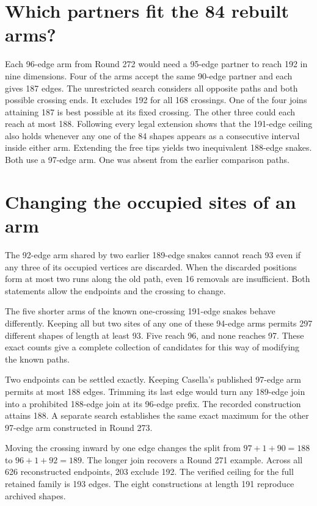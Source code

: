 \documentclass[11pt,a4paper]{article}
\begin{document}
\section{Which partners fit the 84 rebuilt arms?}
Each 96-edge arm from Round 272 would need a 95-edge partner to reach 192 in nine dimensions. Four of the arms accept the same 90-edge partner and each gives 187 edges. The unrestricted search considers all opposite paths and both possible crossing ends. It excludes 192 for all 168 crossings. One of the four joins attaining 187 is best possible at its fixed crossing. The other three could each reach at most 188. Following every legal extension shows that the 191-edge ceiling also holds whenever any one of the 84 shapes appears as a consecutive interval inside either arm. Extending the free tips yields two inequivalent 188-edge snakes. Both use a 97-edge arm. One was absent from the earlier comparison paths.

\section{Changing the occupied sites of an arm}
The 92-edge arm shared by two earlier 189-edge snakes cannot reach 93 even if any three of its occupied vertices are discarded. When the discarded positions form at most two runs along the old path, even 16 removals are insufficient. Both statements allow the endpoints and the crossing to change.

The five shorter arms of the known one-crossing 191-edge snakes behave differently. Keeping all but two sites of any one of these 94-edge arms permits 297 different shapes of length at least 93. Five reach 96, and none reaches 97. These exact counts give a complete collection of candidates for this way of modifying the known paths.

Two endpoints can be settled exactly. Keeping Casella's published 97-edge arm permits at most 188 edges. Trimming its last edge would turn any 189-edge join into a prohibited 188-edge join at its 96-edge prefix. The recorded construction attains 188. A separate search establishes the same exact maximum for the other 97-edge arm constructed in Round 273.

Moving the crossing inward by one edge changes the split from \(97+1+90=188\) to \(96+1+92=189\). The longer join recovers a Round 271 example. Across all 626 reconstructed endpoints, 203 exclude 192. The verified ceiling for the full retained family is 193 edges. The eight constructions at length 191 reproduce archived shapes.
\end{document}
